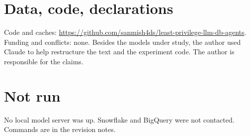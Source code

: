 \documentclass[sigconf,nonacm]{acmart}
\begin{document}
\section{Data, code, declarations}
Code and caches: \url{https://github.com/sanmish4ds/least-privilege-llm-db-agents}. Funding and conflicts: none. Besides the models under study, the author used Claude to help restructure the text and the experiment code. The author is responsible for the claims.
\section{Not run}
No local model server was up. Snowflake and BigQuery were not contacted. Commands are in the revision notes.
\end{document}
